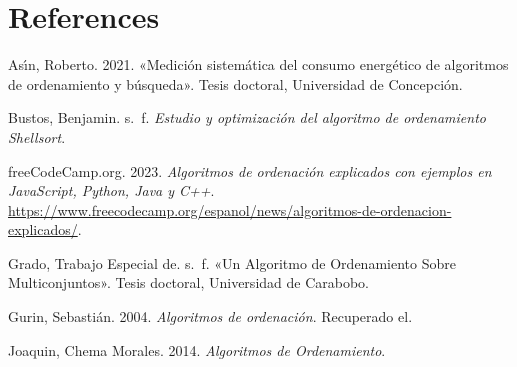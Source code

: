 \documentclass[
  spanish,
  letterpaper,
  DIV=11,
  numbers=noendperiod]{scrreprt}
\newlength{\cslhangindent}
\newenvironment{CSLReferences}[2] %
 {\begin{list}{}{%
  \setlength{\itemindent}{0pt}
  \setlength{\leftmargin}{0pt}
  \setlength{\parsep}{0pt}
  \ifodd #1
   \setlength{\leftmargin}{\cslhangindent}
   \setlength{\itemindent}{-1\cslhangindent}
  \fi
  \setlength{\itemsep}{#2\baselineskip}}}
 {\end{list}}
\begin{document}
\chapter*{References}\label{references}


\protect{}\label{refs}
\begin{CSLReferences}{1}{1}
Ası́n, Roberto. 2021. {«Medici{ó}n sistem{á}tica del consumo energ{é}tico
de algoritmos de ordenamiento y b{ú}squeda»}. Tesis doctoral,
Universidad de Concepci{ó}n.

Bustos, Benjamin. s.~f. \emph{Estudio y optimizaci{ó}n del algoritmo de
ordenamiento Shellsort}.

{freeCodeCamp.org}. 2023. \emph{Algoritmos de ordenación explicados con
ejemplos en JavaScript, Python, Java y C++}.
\url{https://www.freecodecamp.org/espanol/news/algoritmos-de-ordenacion-explicados/}.

Grado, Trabajo Especial de. s.~f. {«Un Algoritmo de Ordenamiento Sobre
Multiconjuntos»}. Tesis doctoral, Universidad de Carabobo.

Gurin, Sebastián. 2004. \emph{Algoritmos de ordenaci{ó}n}. Recuperado
el.

Joaquin, Chema Morales. 2014. \emph{Algoritmos de Ordenamiento}.

\end{CSLReferences}
\end{document}
